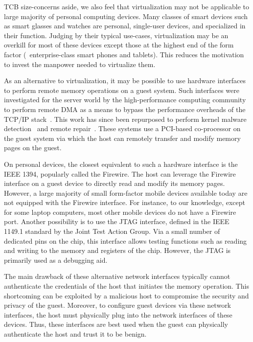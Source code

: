 TCB size-concerns aside, we also feel that virtualization may not be applicable
to large majority of personal computing devices. Many classes of smart devices
such as smart glasses and watches are personal, single-user devices, and
specialized in their function. Judging by their typical use-cases,
virtualization may be an overkill for most of these devices except those at the
highest end of the form factor (\eg~enterprise-class smart phones and tablets).
This reduces the motivation to invest the manpower needed to virtualize them.

%
As an alternative to virtualization, it may be possible to use hardware
interfaces to perform remote memory operations on a guest system. Such
interfaces were investigated for the server world by the high-performance
computing community to perform remote DMA as a means to bypass the performance
overheads of the TCP/IP stack~\cite{mellanox,infiniband}. This work has since
been repurposed to perform kernel malware detection~\cite{copilot:sec04} and
remote repair~\cite{backdoor:icac04}. These systems use a PCI-based
co-processor on the guest system via which the host can remotely transfer and
modify memory pages on the guest.

On personal devices, the closest equivalent to such a hardware interface is the
IEEE 1394, popularly called the Firewire. The host can leverage the Firewire
interface on a guest device to directly read and modify its memory pages.
However, a large majority of small form-factor mobile devices available today
are not equipped with the Firewire interface. For instance, to our knowledge,
except for some laptop computers, most other mobile devices do not have a
Firewire port. Another possibility is to use the JTAG interface, defined in the
IEEE 1149.1 standard by the Joint Test Action Group. Via a small number of
dedicated pins on the chip, this interface allows testing functions such as
reading and writing to the memory and registers of the chip. However, the JTAG
is primarily used as a debugging aid.

The main drawback of these alternative network interfaces typically cannot
authenticate the credentials of the host that initiates the memory operation.
This shortcoming can be exploited by a malicious host to compromise the
security and privacy of the guest. Moreover, to configure guest devices via
these network interfaces, the host must physically plug into the network
interfaces of these devices. Thus, these interfaces are best used when the
guest can physically authenticate the host and trust it to be benign.


